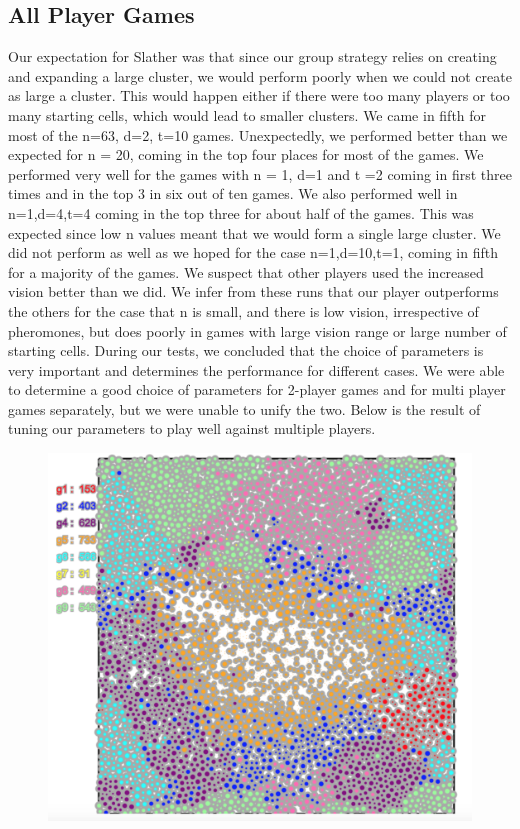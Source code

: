 \subsection{All Player Games}
Our expectation for Slather was that since our group strategy relies on creating and expanding a large cluster, we would perform poorly when we could not create as large a cluster. This would happen either if there were too many players or too many starting cells, which would lead to smaller clusters. We came in fifth for most of the n=63, d=2, t=10 games. Unexpectedly, we performed better than we expected for n = 20, coming in the top four places for most of the games. 
We performed very well for the games with n = 1, d=1 and t =2 coming in first three times and in the top 3 in six out of ten games. We also performed well in n=1,d=4,t=4 coming in the top three for about half of the games. This was expected since low n values meant that we would form a single large cluster.
We did not perform as well as we hoped for the case n=1,d=10,t=1, coming in fifth for a majority of the games. We suspect that other players used the increased vision better than we did.
We infer from these runs that our player outperforms the others for the case that n is small, and there is low vision, irrespective of pheromones, but does poorly in games with large vision range or large number of starting cells.
During our tests, we concluded that the choice of parameters is very important and determines the performance for different cases. We were able to determine a good choice of parameters for 2-player games and for multi player games separately, but we were unable to unify the two. 
Below is the result of tuning our parameters to play well against multiple players.\\

\begin{figure}[h]
\center
\includegraphics[scale=0.6]{multi.png}
\caption{}
\label{fig:multi}
\end{figure}